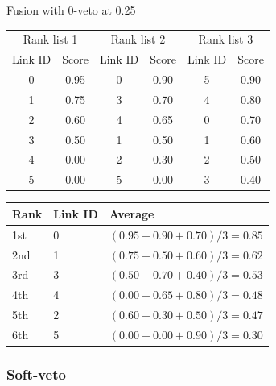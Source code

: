 \begin{example}
  \centering
  \caption{Fusion with $0$-veto at 0.25}
  \label{ex:veto_0}

  \begin{subexample}{\linewidth}
    \centering
    \begin{tabular}{c c|c c|c c}
      \toprule
      \multicolumn{2}{c}{Rank list 1} &
      \multicolumn{2}{c}{Rank list 2} &
      \multicolumn{2}{c}{Rank list 3} \\
      Link ID & Score &
      Link ID & Score &
      Link ID & Score \\
      \midrule
      0 & 0.95 & 0 & 0.90 & 5 & 0.90 \\
      1 & 0.75 & 3 & 0.70 & 4 & 0.80 \\
      2 & 0.60 & 4 & 0.65 & 0 & 0.70 \\
      3 & 0.50 & 1 & 0.50 & 1 & 0.60 \\
      4 & 0.00 & 2 & 0.30 & 2 & 0.50 \\
      5 & 0.00 & 5 & 0.00 & 3 & 0.40 \\
      \bottomrule
    \end{tabular}
  \end{subexample}

  \vspace{0.5cm}

  \begin{subexample}{\linewidth}
    \centering
    \begin{tabular}{l l l}
      \toprule
      Rank & Link ID & Average \\
      \midrule
      1st & 0 & $(0.95 + 0.90 + 0.70)/3 = 0.85$ \\
      2nd & 1 & $(0.75 + 0.50 + 0.60)/3 = 0.62$ \\
      3rd & 3 & $(0.50 + 0.70 + 0.40)/3 = 0.53$ \\
      4th & 4 & $(0.00 + 0.65 + 0.80)/3 = 0.48$ \\
      5th & 2 & $(0.60 + 0.30 + 0.50)/3 = 0.47$ \\
      6th & 5 & $(0.00 + 0.00 + 0.90)/3 = 0.30$ \\
      \bottomrule
    \end{tabular}
  \end{subexample}
\end{example}

\subsubsection{Soft-veto}

